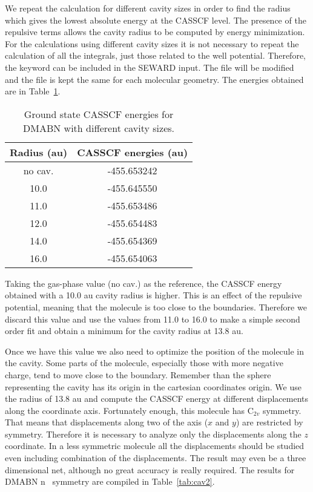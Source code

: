 We repeat the calculation for different cavity sizes in order
to find the radius which gives the lowest absolute energy at the CASSCF
level. The presence of the repulsive terms allows the cavity
radius to be computed by energy minimization. For the calculations
using different cavity sizes it is not necessary to repeat the
calculation of all the integrals, just those related to the 
well potential. Therefore, the keyword  can be
included in the SEWARD input. The  file will be modified
and the  file is kept the same for each molecular
geometry. The energies obtained are in Table~\ref{tab:cav1}.

\begin{table}[ht]
\begin{center}
\begin{tabular}{cc}
\\
Radius (au) & CASSCF energies (au)\\
\hline
no cav.  & -455.653242 \\
10.0     & -455.645550 \\
11.0     & -455.653486 \\
12.0     & -455.654483 \\
14.0     & -455.654369 \\
16.0     & -455.654063 \\
\hline
\end{tabular}
\caption{\label{tab:cav1}Ground state CASSCF energies for DMABN with different cavity sizes.}
\end{center}
\end{table}

Taking the gas-phase value (no cav.) as the reference, the CASSCF
energy obtained with a 10.0 au cavity radius is higher. This is an
effect of the repulsive potential, meaning that the molecule is too close to
the boundaries. Therefore we discard this value and use the values
from 11.0 to 16.0 to make a simple second order fit and obtain a
minimum for the cavity radius at 13.8 au.


Once we have this value we also need to optimize the position of the
molecule in the cavity. Some parts of the molecule, especially those
with more negative charge, tend to move close to the 
boundary. Remember than the sphere representing the cavity has
its origin in the cartesian coordinates origin. We use the radius of
13.8 au and compute the CASSCF energy at different displacements
along the coordinate axis. Fortunately enough, this molecule has
C$_{2v}$ symmetry. That means that displacements along two of the
axis ($x$ and $y$) are restricted by symmetry. Therefore it is
necessary to analyze only the displacements along the $z$ coordinate.
In a less symmetric molecule all
the displacements should be studied even including combination of the displacements.
The result may even be a three dimensional net, although no
great accuracy is really required. The results for DMABN n \Ctv\ symmetry are compiled
in Table~\ref{tab:cav2}.

